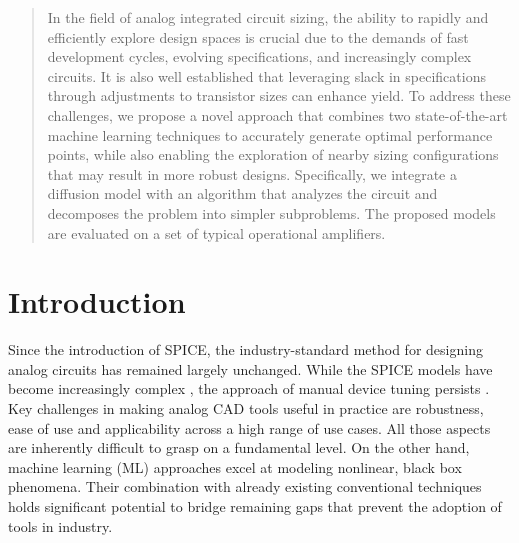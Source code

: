 \documentclass[conference]{IEEEtran}
\begin{document}
\begin{abstract}
In the field of analog integrated circuit sizing, the ability to rapidly and efficiently explore design spaces is crucial due to the demands of fast development cycles, evolving specifications, and increasingly complex circuits. 
It is also well established that leveraging slack in specifications through adjustments to transistor sizes can enhance yield.
To address these challenges, we propose a novel approach that combines two state-of-the-art machine learning techniques to accurately generate optimal performance points, while also enabling the exploration of nearby sizing configurations that may result in more robust designs. Specifically, we integrate a diffusion model with an algorithm that analyzes the circuit and decomposes the problem into simpler subproblems. The proposed models are evaluated on a set of typical operational amplifiers.
\end{abstract}


\section{Introduction}\label{sec:intro}
	Since the introduction of SPICE, the industry-standard method for designing analog circuits has remained largely unchanged. While the SPICE models have become increasingly complex \cite{gatermann22mosfet}, the approach of manual device tuning persists \cite{gielen23workshop}. Key challenges in making analog CAD tools useful in practice are robustness, ease of use and applicability across a high range of use cases. All those aspects are inherently difficult to grasp on a fundamental level. On the other hand, machine learning (ML) approaches excel at modeling nonlinear, black box phenomena. Their combination with already existing conventional techniques holds significant potential to bridge remaining gaps that prevent the adoption of tools in industry.
	
\end{document}
